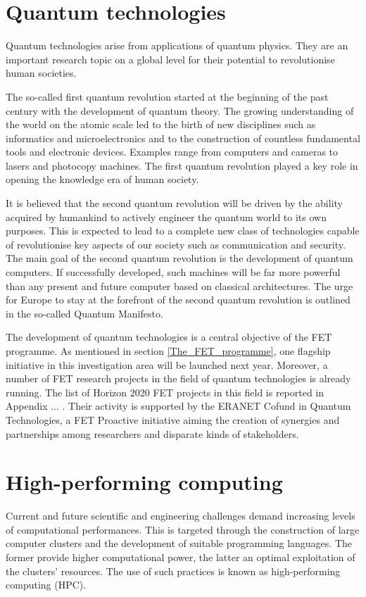 \section{Quantum technologies} \label{Quantum technologies and High-performing computers}
Quantum technologies arise from applications of quantum physics. They are an important research topic on a global level for their potential to revolutionise human societies.

The so-called first quantum revolution started at the beginning of the past century with the development of quantum theory. The growing understanding of the world on the atomic scale led to the birth of new disciplines such as informatics and microelectronics and to the construction of countless fundamental tools and electronic devices. Examples range from computers and cameras to lasers and photocopy machines. The first quantum revolution played a key role in opening the knowledge era of human society.

It is believed that the second quantum revolution will be driven by the ability acquired by humankind to actively engineer the quantum world to its own purposes. This is expected to lead to a complete new class of technologies capable of revolutionise key aspects of our society such as communication and security. The main goal of the second quantum revolution is the development of quantum computers. If successfully developed, such machines will be far more powerful than any present and future computer based on classical architectures. The urge for Europe to stay at the forefront of the second quantum revolution is outlined in the so-called Quantum Manifesto.


The development of quantum technologies is a central objective of the FET programme. As mentioned in section \ref{The_FET_programme}, one flagship initiative in this investigation area will be launched next year. Moreover, a number of FET research projects in the field of quantum technologies is already running. The list of Horizon 2020 FET projects in this field is reported in Appendix ... . Their activity is supported by the ERANET Cofund in Quantum Technologies, a FET Proactive initiative aiming the creation of synergies and partnerships among researchers and disparate kinds of stakeholders. 

\section{High-performing computing}
Current and future scientific and engineering challenges demand increasing levels of computational performances. This is targeted through the construction of large computer clusters and the development of suitable programming languages. The former provide higher computational power, the latter an optimal exploitation of the clusters' resources. The use of such practices is known as high-performing computing (HPC).

